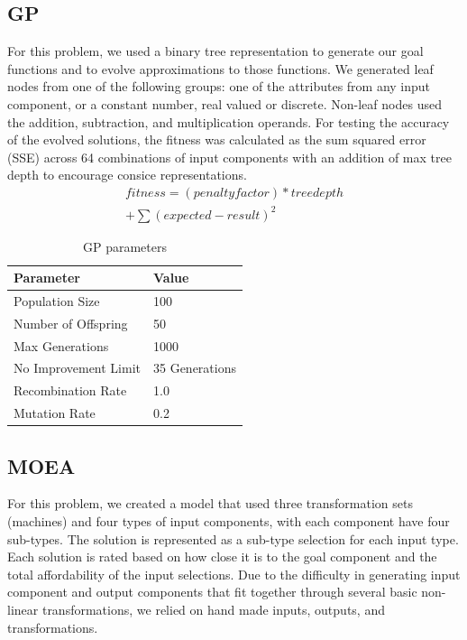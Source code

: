 \documentclass{IEEEtran}
\begin{document}
\subsection{GP}
For this problem, we used a binary tree representation to generate our goal functions and to evolve approximations to those functions. We generated leaf nodes from one of the following groups: one of the attributes from any input component, or a constant number, real valued or discrete. Non-leaf nodes used the addition, subtraction, and multiplication operands. For testing the accuracy of the evolved solutions, the fitness was calculated as the sum squared error (SSE) across 64 combinations of input components with an addition of max tree depth to encourage consice representations.
\begin{equation} \label{eq:1}
\begin{split}
fitness=(penaltyfactor)*treedepth \\
+ \sum (expected-result)^{2}
\end{split}
\end{equation}

\begin{table}[!h]
\centering
\caption{GP parameters}
\begin{tabular}{l|l}
\toprule[1.5pt]
Parameter & Value \\\midrule[1pt]
Population Size & 100 \\ 
Number of Offspring & 50 \\
Max Generations & 1000 \\
No Improvement Limit & 35 Generations \\
Recombination Rate & 1.0 \\
Mutation Rate & 0.2 \\
\bottomrule[1.25pt]
\end{tabular}
\end{table}

\subsection{MOEA}
For this problem, we created a model that used three transformation sets (machines) and four types of input components, with each component have four sub-types. The solution is represented as a sub-type selection for each input type. Each solution is rated based on how close it is to the goal component and the total affordability of the input selections. Due to the difficulty in generating input component and output components that fit together through several basic non-linear transformations, we relied on hand made inputs, outputs, and transformations.
\end{document}
